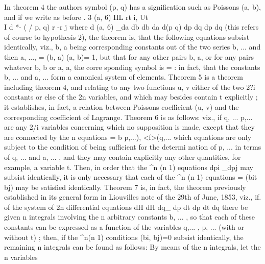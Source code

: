 \documentclass[12pt,a4paper]{article}
\theoremstyle{definition}
\begin{document}
In theorem 4 the authors symbol (p, q) has a signification such as Poissons (a, b),
and if we write as before
. 3 (a, 6)
IIL rt i, Ut\\ I d *- ( / p, q) r -r j
where
d (a, 6) _da db db da
d(p q) dp dq dp dq
(this refers of course to hypothesis 2), the theorem is, that the following equations
subsist identically, viz., b, a being corresponding constants out of the two series b, ...
and then
a, ...,
=
(b, a) (a, b)= 1,
but that for any other pairs b, a, or for any pairs whatever b, b or a, a, the corre
sponding symbol is = : in fact, that the constants b, ... and a, ... form a canonical
system of elements.
Theorem 5 is a theorem including theorem 4, and relating to any two functions
u, v either of the two 2?i constants or else of the 2n variables, and which may besides
contain t explicitly ; it establishes, in fact, a relation between Poissons coefficient (u, v)
and the corresponding coefficient of Lagrange.
Theorem 6 is as follows: viz., if q, ... p,... are any 2/i variables concerning which
no supposition is made, except that they are connected by the n equations
=
b p,...),
<f>(q,...
which equations are only subject to the condition of being sufficient for the determi
nation of p, ... in terms of q, ... and a, ... , and they may contain explicitly any
other quantities, for example, a variable t. Then, in order that the ^n (n 1) equations
dpi _dpj
may subsist identically, it is only necessary that each of the ^n (n 1) equations
=
(bit bj) may be satisfied identically.
Theorem 7 is, in fact, the theorem previously established in its general form in
Liouvilles note of the 29th of June, 1853, viz., if. of the system of 2n differential
equations
dH dH
dq_ dp
dt dp dt dq
there be given n integrals involving the n arbitrary constants b, ... , so that each of
these constants can be expressed as a function of the variables q,... , p, ... (with or
without t) ; then, if the ^n(n 1) conditions (bi, bj)=0 subsist identically, the remaining
n integrals can be found as follows: By means of the n integrals, let the n variables


\end{document}
